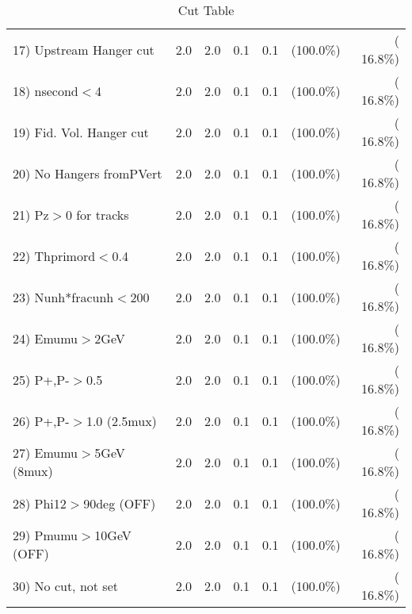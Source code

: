 \begin{table}[h!]
\begin{tabular}{||l||r|r|r|r|r|r||}
 17) Upstream Hanger cut  &          2.0 &          2.0 &          0.1 &          0.1 & (100.0\%) & ( 16.8\%) \\
 18) nsecond$<$4          &          2.0 &          2.0 &          0.1 &          0.1 & (100.0\%) & ( 16.8\%) \\
 19) Fid. Vol. Hanger cut &          2.0 &          2.0 &          0.1 &          0.1 & (100.0\%) & ( 16.8\%) \\
 20) No Hangers fromPVert &          2.0 &          2.0 &          0.1 &          0.1 & (100.0\%) & ( 16.8\%) \\
 21) Pz$>$0 for tracks    &          2.0 &          2.0 &          0.1 &          0.1 & (100.0\%) & ( 16.8\%) \\
 22) Thprimord$<$0.4      &          2.0 &          2.0 &          0.1 &          0.1 & (100.0\%) & ( 16.8\%) \\
 23) Nunh*fracunh$<$200   &          2.0 &          2.0 &          0.1 &          0.1 & (100.0\%) & ( 16.8\%) \\
 24) Emumu$>$2GeV         &          2.0 &          2.0 &          0.1 &          0.1 & (100.0\%) & ( 16.8\%) \\
 25) P+,P-$>$0.5          &          2.0 &          2.0 &          0.1 &          0.1 & (100.0\%) & ( 16.8\%) \\
 26) P+,P-$>$1.0 (2.5mux) &          2.0 &          2.0 &          0.1 &          0.1 & (100.0\%) & ( 16.8\%) \\
 27) Emumu$>$5GeV  (8mux) &          2.0 &          2.0 &          0.1 &          0.1 & (100.0\%) & ( 16.8\%) \\
 28) Phi12$>$90deg  (OFF) &          2.0 &          2.0 &          0.1 &          0.1 & (100.0\%) & ( 16.8\%) \\
 29) Pmumu$>$10GeV  (OFF) &          2.0 &          2.0 &          0.1 &          0.1 & (100.0\%) & ( 16.8\%) \\
 30) No cut, not set      &          2.0 &          2.0 &          0.1 &          0.1 & (100.0\%) & ( 16.8\%) \\
 \hline
 \hline
 \end{tabular}
 \caption{Cut Table           }
 \label{tab-cutcohjpsi-mumu_cohrho0}
 \end{table}
